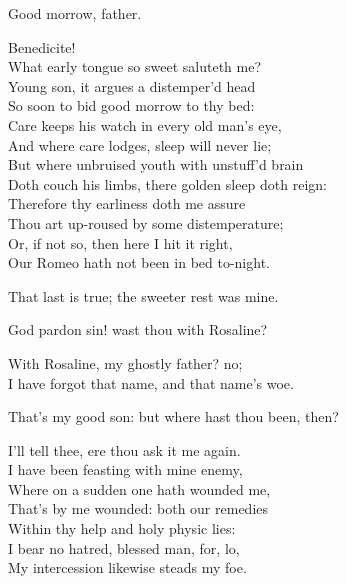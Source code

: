\begin{speech}
Good morrow, father. \\
\end{speech}
\begin{speech}
Benedicite! \\
What early tongue so sweet saluteth me? \\
Young son, it argues a distemper'd head \\
So soon to bid good morrow to thy bed: \\
Care keeps his watch in every old man's eye, \\
And where care lodges, sleep will never lie; \\
But where unbruised youth with unstuff'd brain \\
Doth couch his limbs, there golden sleep doth reign: \\
Therefore thy earliness doth me assure \\
Thou art up-roused by some distemperature; \\
Or, if not so, then here I hit it right, \\
Our Romeo hath not been in bed to-night. \\
\end{speech}
\begin{speech}
That last is true; the sweeter rest was mine. \\
\end{speech}
\begin{speech}
God pardon sin! wast thou with Rosaline? \\
\end{speech}
\begin{speech}
With Rosaline, my ghostly father? no; \\
I have forgot that name, and that name's woe. \\
\end{speech}
\begin{speech}
That's my good son: but where hast thou been, then?
\\
\end{speech}
\begin{speech}
I'll tell thee, ere thou ask it me again. \\
I have been feasting with mine enemy, \\
Where on a sudden one hath wounded me, \\
That's by me wounded: both our remedies \\
Within thy help and holy physic lies: \\
I bear no hatred, blessed man, for, lo, \\
My intercession likewise steads my foe. \\
\end{speech}
